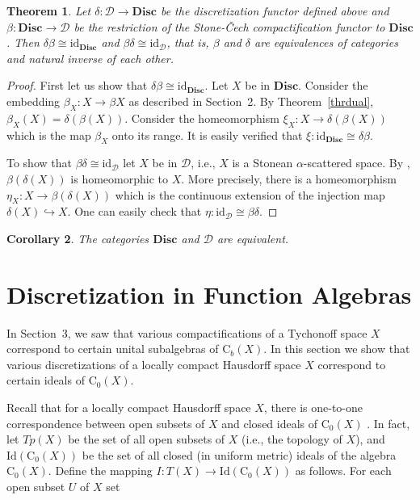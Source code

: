 \documentclass[manuscript]{amsart}
\newtheorem{theorem}{Theorem}[section]
\newtheorem{corollary}[theorem]{Corollary}
\theoremstyle{definition}
\begin{document}
\begin{theorem}\label{thrcdual}
Let $\delta :\mathcal{D}\to  \mathbf{Disc}$ be the discretization functor defined  above and
$\beta :\mathbf{Disc}\to \mathcal{D}$ be the restriction of the Stone-\v{C}ech compactification functor
to $\mathbf{Disc}$.
Then $\delta \beta\cong\mathrm{id}_{\mathbf{Disc}}$ and
$\beta\delta\cong\mathrm{id}_{\mathcal{D}}$, that is,
$\beta$ and $\delta$ are equivalences of categories and natural inverse of each other.
\end{theorem}
\begin{proof}
First let us show that $\delta \beta\cong\mathrm{id}_{\mathbf{Disc}}$.
Let $X$ be in $\mathbf{Disc}$. Consider the embedding
$\beta_{X}:X\to \beta X$ as described in Section~2. By Theorem~\ref{thrdual},
$\beta_{X}(X)=\delta(\beta(X))$. Consider the homeomorphism
$\xi_{X}:X\to \delta(\beta(X))$ which is the map $\beta_{X}$ onto its range.
It is easily verified that
$\xi: \mathrm{id}_{\mathbf{Disc}}\cong \delta \beta$.

To show that $\beta\delta\cong\mathrm{id}_{\mathcal{D}}$ let
$X$ be in $\mathcal{D}$, i.e.,
$X$ is a Stonean $\alpha$-scattered space.
By \cite[Corollary~III.1.8]{ta79},
$\beta(\delta(X))$ is homeomorphic to $X$. More precisely,
there is a homeomorphism
$\eta_{X}:X\to \beta(\delta(X))$ which is
the continuous extension  of
the injection map $\delta(X)\hookrightarrow X$.
One can easily check that
$\eta : \mathrm{id}_{\mathcal{D}}\cong \beta\delta$.
\end{proof}
\begin{corollary}
The categories $\mathbf{Disc}$ and $\mathcal{D}$ are equivalent.
\end{corollary}

\section{Discretization in Function Algebras}
\noindent
In Section~3, we saw that various compactifications of a Tychonoff
space $X$ correspond to certain unital subalgebras of $\mathrm{C}_{b}(X)$.
In this section we show that various discretizations of a locally compact Hausdorff
space $X$ correspond to certain ideals of $\mathrm{C}_{0}(X)$.

Recall that for a  locally compact Hausdorff space $X$, there is one-to-one correspondence between open subsets of
 $X$ and closed ideals of $\mathrm{C}_{0}(X)$ \cite[Exercise~2.A]{wo93}.
 In fact, let $Tp(X)$ be the set of all open subsets of $X$ (i.e., the topology of $X$),
 and $\mathrm{Id}(\mathrm{C}_{0}(X))$ be the set of all closed (in uniform metric)
 ideals of the algebra $\mathrm{C}_{0}(X)$.
 Define the mapping
 $I:T(X)\to \mathrm{Id}(\mathrm{C}_{0}(X))$ as follows.
 For each open subset $U$ of $X$ set
\end{document}
